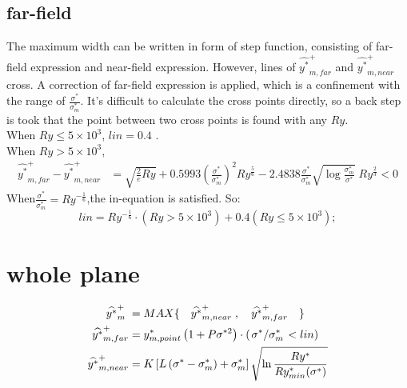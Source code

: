\documentclass[review, 1p, number, sort&compress,table]{elsarticle}
\begin{document}
   \subsection{far-field}
    The maximum width can be written in form of step function, consisting of far-field expression and near-field expression.  However, lines of $\widehat{y^*}_{m,far}^+$ and $\widehat{y^*}_{m,near}^+  $ cross. A correction of far-field expression is applied, which is a confinement with the range of $\frac{\sigma^*}{\sigma_m^*}$. It's difficult to calculate the cross points directly, so a back step is took that the point between two cross points is found with any $Ry$.
    \\
    When $Ry\leqslant 5\times10^3$, $lin=0.4$ . \\
    When $Ry > 5\times10^3$, 
    \begin{align}
	  \nonumber
    \widehat{y^*}_{m,far}^+-\widehat{y^*}_{m,near}^+ &= \sqrt{\frac{2}{e}Ry}+0.5993\left(\frac{\sigma^*}{\sigma_m^*}\right)^2Ry^{\frac{5}{6}}-2.4838\frac{\sigma^*}{\sigma_m^*}\sqrt{\log{\frac{\sigma_m^*}{\sigma^*}}} \; Ry^{\frac{2}{3}}<0 
    \end{align}
    When$\frac{\sigma^*}{\sigma_m^*} =Ry^{-\frac{1}{6}} $,the in-equation is satisfied. So:
    \\
    \begin{equation}
    	lin   =  Ry^{-\frac{1}{6}}  \cdot \left(Ry>5\times10^3\right) +0.4\left(Ry \leqslant 5\times10^3\right);   
    \end{equation}
	\section{whole plane}
		\begin{align}  
		\widehat{y^*}_{m}^+ \;  & =  MAX\{ \quad \widehat{y^*}_{m,near}^+ \; , \quad  \widehat{y^*}_{m,far}^+ \quad \}
			\\\nonumber
		\widehat{y^*}_{m,far}^+& = y_{m,point}^*\left(1+P\sigma^{*2}\right) \cdot  \left( \left. \sigma^*  \middle / \sigma^*_m \right.  < lin \right)	 
			\\ \nonumber
		\widehat{y^*}_{m,near}^+& = K\left[L\left(\sigma^*-\sigma^{*}_m\right)+\sigma^{*}_m 	\right]\sqrt{\ln{\frac{Ry^{*}}{Ry_{min}^{*}(\sigma^{*})}}}
		\end{align} 
		
\end{document}
